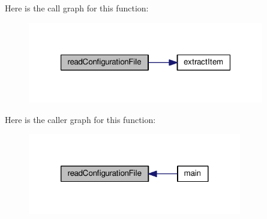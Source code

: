 Here is the call graph for this function\-:\nopagebreak
\begin{figure}[H]
\begin{center}
\leavevmode
\includegraphics[width=292pt]{readConfigurationFile_8hh_a4e3ab429a1d72d0d31c7290c97731e1e_cgraph}
\end{center}
\end{figure}




Here is the caller graph for this function\-:\nopagebreak
\begin{figure}[H]
\begin{center}
\leavevmode
\includegraphics[width=264pt]{readConfigurationFile_8hh_a4e3ab429a1d72d0d31c7290c97731e1e_icgraph}
\end{center}
\end{figure}


